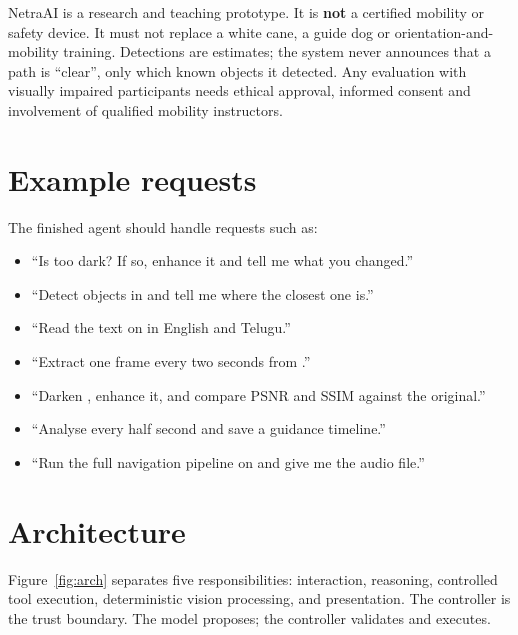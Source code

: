 \begin{safetybox}
NetraAI is a research and teaching prototype. It is \textbf{not} a certified mobility or safety device. It must not
replace a white cane, a guide dog or orientation-and-mobility training. Detections are estimates; the system never
announces that a path is ``clear'', only which known objects it detected. Any evaluation with visually impaired
participants needs ethical approval, informed consent and involvement of qualified mobility instructors.
\end{safetybox}

\section{Example requests}
The finished agent should handle requests such as:
\begin{itemize}
  \item ``Is  too dark? If so, enhance it and tell me what you changed.''
  \item ``Detect objects in  and tell me where the closest one is.''
  \item ``Read the text on  in English and Telugu.''
  \item ``Extract one frame every two seconds from .''
  \item ``Darken , enhance it, and compare PSNR and SSIM against the original.''
  \item ``Analyse  every half second and save a guidance timeline.''
  \item ``Run the full navigation pipeline on  and give me the audio file.''
\end{itemize}

\section{Architecture}
Figure~\ref{fig:arch} separates five responsibilities: interaction, reasoning, controlled tool execution, deterministic
vision processing, and presentation. The controller is the trust boundary. The model proposes; the controller validates and executes.

